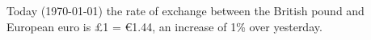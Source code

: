 \documentclass{article}
\begin{document}
Today (\today) the rate of exchange between the British
pound and European euro is \pounds 1 = \euro1.44, an
increase of 1\% over yesterday.
\end{document}
